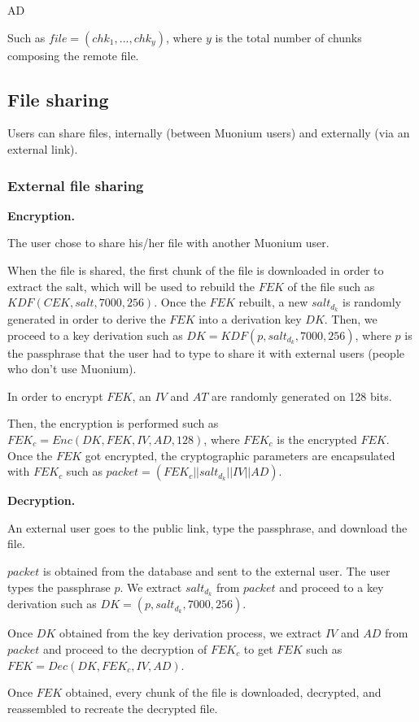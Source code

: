 AD\documentclass[a4paper,10pt]{article}
\begin{document}
Such as $file=(chk_1,...,chk_y)$, where $y$ is the total number of chunks composing the remote file.

\medskip

\subsection{File sharing}
Users can share files, internally (between Muonium users) and externally (via an external link).

\subsubsection{External file sharing}

\textbf{Encryption.}

The user chose to share his/her file with another Muonium user.

When the file is shared, the first chunk of the file is downloaded in order to extract the salt, which will
be used to rebuild the $FEK$ of the file such as $KDF(CEK, salt, 7000, 256)$. Once the $FEK$ rebuilt,
a new $salt_d_k$ is randomly generated in order to derive the $FEK$ into a derivation key $DK$. Then,
we proceed to a key derivation such as $DK=KDF(p, salt_d_k, 7000, 256)$, where $p$ is the passphrase
that the user had to type to share it with external users (people who don't use Muonium).

In order to encrypt $FEK$, an $IV$ and $AT$ are randomly generated on 128 bits.

Then, the encryption is performed such as $FEK_c=Enc(DK, FEK, IV, AD, 128)$, where $FEK_c$ is the
encrypted $FEK$. Once the $FEK$ got encrypted, the cryptographic parameters are encapsulated with
$FEK_c$ such as $packet=(FEK_c||salt_d_k||IV||AD)$.

\textbf{Decryption.}

An external user goes to the public link, type the passphrase, and download the file.

$packet$ is obtained from the database and sent to the external user. The user types the passphrase
$p$. We extract $salt_d_k$ from $packet$ and proceed to a key derivation such as $DK=(p, salt_d_k, 7000, 256)$.

Once $DK$ obtained from the key derivation process, we extract $IV$ and $AD$ from $packet$ and proceed to
the decryption of $FEK_c$ to get $FEK$ such as $FEK=Dec(DK, FEK_c, IV, AD)$.

Once $FEK$ obtained, every chunk of the file is downloaded, decrypted, and reassembled to recreate the
decrypted file.
\end{document}
